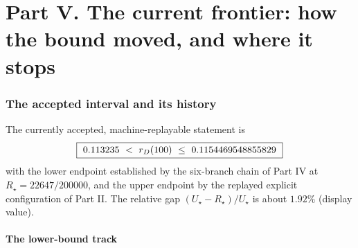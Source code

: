 \part*{Part V. The current frontier: how the bound moved, and where it stops}
\setcounter{section}{0}

\section{The accepted interval and its history}

The currently accepted, machine-replayable statement is
\[
\boxed{\ 0.113235\ <\ \rD(100)\ \le\ 0.1154469548855829\ }
\]
with the lower endpoint established by the six-branch chain of Part IV at $R_\star=22647/200000$,
and the upper endpoint by the replayed explicit configuration of Part II. The relative gap
$(U_\star-R_\star)/U_\star$ is about $1.92\%$ (display value).

\subsection{The lower-bound track}

